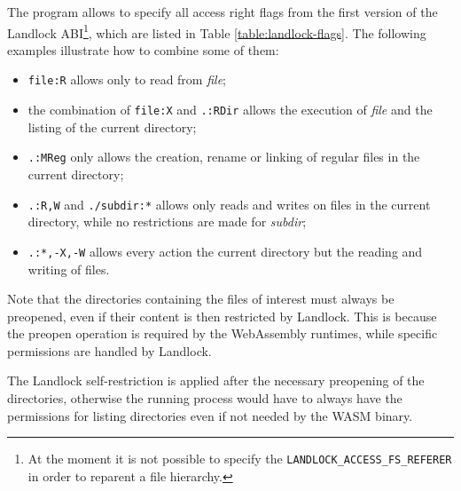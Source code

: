 The program allows to specify all access right flags from the first version of the Landlock
ABI\footnote{At the moment it is not possible to specify the \texttt{LANDLOCK\_ACCESS\_FS\_REFERER} in order to reparent a file hierarchy.},
which are listed in Table \ref{table:landlock-flags}.
The following examples illustrate how to combine some of them:
\begin{itemize}
  \item \texttt{file:R} allows only to read from \textit{file};
  \item the combination of \texttt{file:X} and \texttt{.:RDir} allows the execution of \textit{file} and the listing of the current directory;
  \item \texttt{.:MReg} only allows the creation, rename or linking of regular files in the current directory;
  \item \texttt{.:R,W} and \texttt{./subdir:*} allows only reads and writes on files in the current directory, while no restrictions are
        made for \textit{subdir};
  \item \texttt{.:*,-X,-W} allows every action the current directory but the reading and writing of files.
\end{itemize}

Note that the directories containing the files of interest must always be preopened,
even if their content is then restricted by Landlock. This is because the preopen operation
is required by the WebAssembly runtimes, while specific permissions are handled by Landlock.

The Landlock self-restriction is applied after the necessary preopening of the directories,
otherwise the running process would have to always have the permissions for listing directories even if
not needed by the WASM binary.

\vspace*{1cm}

